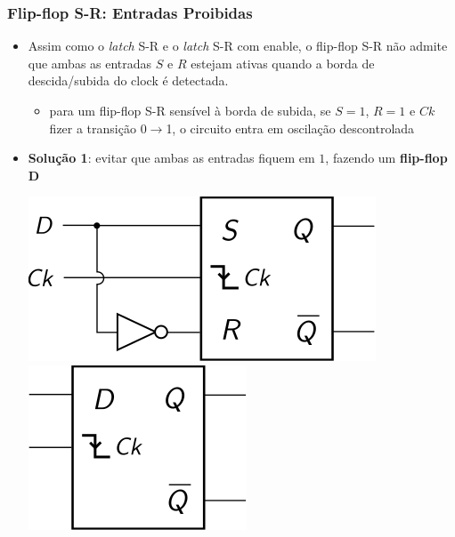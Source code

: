 \documentclass{beamer}
\begin{document}
\begin{frame}
\end{frame}


\begin{frame}
\frametitle{Flip-flop S-R: Entradas Proibidas}

\begin{itemize}
\item Assim como o \emph{latch} S-R e o \emph{latch} S-R com enable, o
flip-flop S-R não admite que ambas as entradas $S$ e $R$ estejam
ativas quando a borda de descida/subida do clock é detectada.
\pause
\begin{itemize}
\item para um flip-flop S-R sensível à borda de subida, se $S = 1$,
$R = 1$ e $Ck$ fizer a transição 0$\rightarrow$1, o circuito
entra em oscilação descontrolada
\end{itemize}
\pause
\item \textbf{Solução 1}: evitar que ambas as entradas fiquem em $1$,
fazendo um \textbf{flip-flop D}

\begin{center}
\includegraphics{images/flipflopD_circuit}%
\hspace{3ex}\pause%
\raisebox{40pt}{\Huge$=$}\pause%
\hspace{3ex}%
\includegraphics{images/flipflopD_blackbox}
\end{center}

\end{itemize}

\end{frame}
\end{document}
